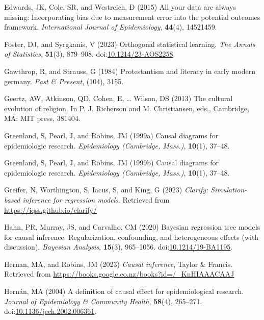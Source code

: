 \documentclass[
  singlecolumn,
  9pt]{article}
\begin{document}
\begin{CSLReferences}
Edwards, JK, Cole, SR, and Westreich, D (2015) All your data are always
missing: Incorporating bias due to measurement error into the potential
outcomes framework. \emph{International Journal of Epidemiology},
\textbf{44}(4), 14521459.

Foster, DJ, and Syrgkanis, V (2023) Orthogonal statistical learning.
\emph{The Annals of Statistics}, \textbf{51}(3), 879--908.
doi:\href{https://doi.org/10.1214/23-AOS2258}{10.1214/23-AOS2258}.

Gawthrop, R, and Strauss, G (1984) Protestantism and literacy in early
modern germany. \emph{Past \& Present}, (104), 3155.

Geertz, AW, Atkinson, QD, Cohen, E, \ldots{} Wilson, DS (2013) The
cultural evolution of religion. In P. J. Richerson and M. Christiansen,
eds., Cambridge, MA: MIT press, 381404.

Greenland, S, Pearl, J, and Robins, JM (1999a) Causal diagrams for
epidemiologic research. \emph{Epidemiology (Cambridge, Mass.)},
\textbf{10}(1), 37--48.

Greenland, S, Pearl, J, and Robins, JM (1999b) Causal diagrams for
epidemiologic research. \emph{Epidemiology (Cambridge, Mass.)},
\textbf{10}(1), 37--48.

Greifer, N, Worthington, S, Iacus, S, and King, G (2023) \emph{Clarify:
Simulation-based inference for regression models}. Retrieved from
\url{https://iqss.github.io/clarify/}

Hahn, PR, Murray, JS, and Carvalho, CM (2020) Bayesian regression tree
models for causal inference: Regularization, confounding, and
heterogeneous effects (with discussion). \emph{Bayesian Analysis},
\textbf{15}(3), 965--1056.
doi:\href{https://doi.org/10.1214/19-BA1195}{10.1214/19-BA1195}.

Hernan, MA, and Robins, JM (2023) \emph{Causal inference}, Taylor \&
Francis. Retrieved from
\url{https://books.google.co.nz/books?id=/_KnHIAAACAAJ}

Hernán, MA (2004) A definition of causal effect for epidemiological
research. \emph{Journal of Epidemiology \& Community Health},
\textbf{58}(4), 265--271.
doi:\href{https://doi.org/10.1136/jech.2002.006361}{10.1136/jech.2002.006361}.


\end{CSLReferences}
\end{document}
